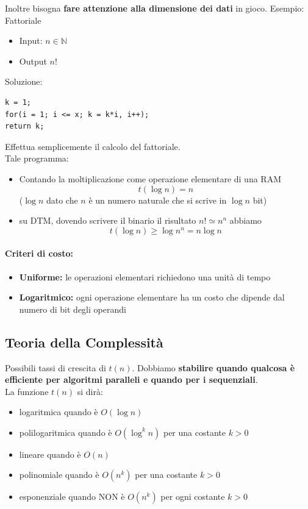 \documentclass[11pt]{article}
\begin{document}
	\newpage
	
	Inoltre bisogna \textbf{fare attenzione alla dimensione dei dati} in gioco. Esempio: Fattoriale
	\begin{itemize}
		\item Input: $n \in \mathbb{N}$
		\item Output $n!$
	\end{itemize}
	Soluzione: 
	\begin{lstlisting}
k = 1; 
for(i = 1; i <= x; k = k*i, i++);
return k;
	\end{lstlisting}
	Effettua semplicemente il calcolo del fattoriale.\\
	
	Tale programma:
	\begin{itemize}
		\item Contando la moltiplicazione come operazione elementare di una RAM 
		$$ t(\log n) = n $$
		($\log n$ dato che $n$ è un numero naturale che si scrive in $\log n$ bit)
		\item su DTM, dovendo scrivere il binario il risultato $n! \simeq n^n$ abbiamo
		$$ t(\log n) \geq \log n^n = n \log n $$
	\end{itemize}
	
	\paragraph{Criteri di costo: }
	\begin{itemize}
		\item \textbf{Uniforme:} le operazioni elementari richiedono una unità di tempo 
		\item \textbf{Logaritmico:} ogni operazione elementare ha un costo che dipende dal numero di bit degli operandi
	\end{itemize}
	
	\newpage
	
	\subsection*{Teoria della Complessità}
	
	Possibili tassi di crescita di $t(n)$. Dobbiamo \textbf{stabilire quando qualcosa è efficiente per algoritmi paralleli e quando per i sequenziali}.\\
	
	La funzione $t(n)$ si dirà: 
	\begin{itemize}
		\item logaritmica quando è $O(\log n)$
		\item polilogaritmica quando è $O(\log^k n)$ per una costante $k>0$
		\item lineare quando è $O(n)$
		\item polinomiale quando è $O(n^k)$ per una costante $k>0$
		\item esponenziale quando NON è $O(n^k)$ per ogni costante $k>0$ 
	\end{itemize}
	
\end{document}
